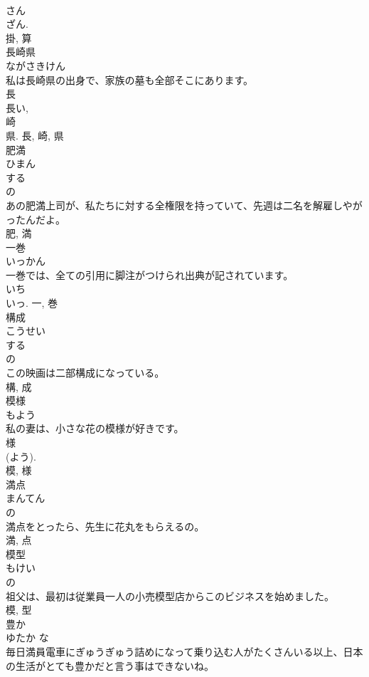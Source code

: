\documentclass[8pt]{extreport}
\begin{document}
\begin{CJK}{UTF8}{min}
\\	さん 
\\	ざん. 
\\	掛, 算	
\\	長崎県	
\\	ながさきけん	
\\	私は長崎県の出身で、家族の墓も全部そこにあります。	
\\	長 
\\	長い, 
\\	崎 
\\	県.	長, 崎, 県	
\\	肥満	
\\	ひまん	
\\	する 
\\	の 
\\	あの肥満上司が、私たちに対する全権限を持っていて、先週は二名を解雇しやがったんだよ。	
\\	肥, 満	
\\	一巻	
\\	いっかん	
\\	一巻では、全ての引用に脚注がつけられ出典が記されています。	
\\	いち 
\\	いっ.	一, 巻	
\\	構成	
\\	こうせい	
\\	する 
\\	の 
\\	この映画は二部構成になっている。	
\\	構, 成	
\\	模様	
\\	もよう	
\\	私の妻は、小さな花の模様が好きです。	
\\	様 
\\	(よう). 
\\	模, 様	
\\	満点	
\\	まんてん	
\\	の 
\\	満点をとったら、先生に花丸をもらえるの。	
\\	満, 点	
\\	模型	
\\	もけい	
\\	の 
\\	祖父は、最初は従業員一人の小売模型店からこのビジネスを始めました。	
\\	模, 型	
\\	豊か	
\\	ゆたか	な 
\\	毎日満員電車にぎゅうぎゅう詰めになって乗り込む人がたくさんいる以上、日本の生活がとても豊かだと言う事はできないね。	

\end{CJK}
\end{document}
